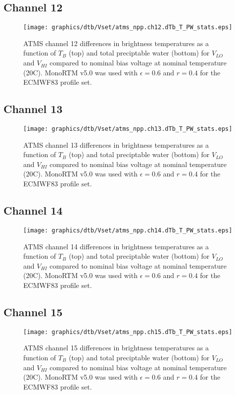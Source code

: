 \subsection{Channel 12}
\begin{figure}[H]
  \label{fig:Vset.ch12_dtb}
  \centering
  \hspace{1.5cm}\texttt{[image: graphics/dtb/Vset/atms\_npp.ch12.dTb\_T\_PW\_stats.eps]}
  \caption{ATMS channel 12 differences in brightness temperatures as a function of $T_B$ (top) and total preciptable water (bottom) for $V_{LO}$ and $V_{HI}$ compared to nominal bias voltage at nominal temperature (20\textdegree{}C). MonoRTM v5.0 was used with $\epsilon=0.6$ and $r=0.4$ for the ECMWF83 profile set.}
\end{figure}

\subsection{Channel 13}
\begin{figure}[H]
  \label{fig:Vset.ch13_dtb}
  \centering
  \hspace{1.5cm}\texttt{[image: graphics/dtb/Vset/atms\_npp.ch13.dTb\_T\_PW\_stats.eps]}
  \caption{ATMS channel 13 differences in brightness temperatures as a function of $T_B$ (top) and total preciptable water (bottom) for $V_{LO}$ and $V_{HI}$ compared to nominal bias voltage at nominal temperature (20\textdegree{}C). MonoRTM v5.0 was used with $\epsilon=0.6$ and $r=0.4$ for the ECMWF83 profile set.}
\end{figure}

\subsection{Channel 14}
\begin{figure}[H]
  \label{fig:Vset.ch14_dtb}
  \centering
  \hspace{1.5cm}\texttt{[image: graphics/dtb/Vset/atms\_npp.ch14.dTb\_T\_PW\_stats.eps]}
  \caption{ATMS channel 14 differences in brightness temperatures as a function of $T_B$ (top) and total preciptable water (bottom) for $V_{LO}$ and $V_{HI}$ compared to nominal bias voltage at nominal temperature (20\textdegree{}C). MonoRTM v5.0 was used with $\epsilon=0.6$ and $r=0.4$ for the ECMWF83 profile set.}
\end{figure}

\subsection{Channel 15}
\begin{figure}[H]
  \label{fig:Vset.ch15_dtb}
  \centering
  \hspace{1.5cm}\texttt{[image: graphics/dtb/Vset/atms\_npp.ch15.dTb\_T\_PW\_stats.eps]}
  \caption{ATMS channel 15 differences in brightness temperatures as a function of $T_B$ (top) and total preciptable water (bottom) for $V_{LO}$ and $V_{HI}$ compared to nominal bias voltage at nominal temperature (20\textdegree{}C). MonoRTM v5.0 was used with $\epsilon=0.6$ and $r=0.4$ for the ECMWF83 profile set.}
\end{figure}


